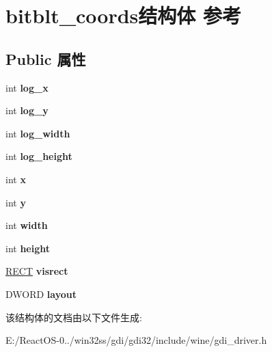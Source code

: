\hypertarget{structbitblt__coords}{}\section{bitblt\+\_\+coords结构体 参考}
\label{structbitblt__coords}
\subsection*{Public 属性}
\begin{DoxyCompactItemize}
\item 
\mbox{\label{structbitblt__coords_a80fb5dfafa963c3a7a1f506403ad9fc3}} 
int {\bfseries log\+\_\+x}
\item 
\mbox{\label{structbitblt__coords_a01d92140cc63198579fd06291dcff755}} 
int {\bfseries log\+\_\+y}
\item 
\mbox{\label{structbitblt__coords_a00125c247fc323b56db01a673d31b216}} 
int {\bfseries log\+\_\+width}
\item 
\mbox{\label{structbitblt__coords_a0658c4065a6dc64f9de3ae4c4e26aa55}} 
int {\bfseries log\+\_\+height}
\item 
\mbox{\label{structbitblt__coords_a5372872ac2b8e2645fd9c67e0291373f}} 
int {\bfseries x}
\item 
\mbox{\label{structbitblt__coords_a738c1b1f34c0a2221623c58daeb06961}} 
int {\bfseries y}
\item 
\mbox{\label{structbitblt__coords_ad80b4a1c8b5b30448371c91dba2be332}} 
int {\bfseries width}
\item 
\mbox{\label{structbitblt__coords_abd0bb4ae2471ae0fb62a935e040ecd3e}} 
int {\bfseries height}
\item 
\mbox{\label{structbitblt__coords_a6ffca3e62b070df035143cc268e27073}} 
\hyperlink{structtag_r_e_c_t}{R\+E\+CT} {\bfseries visrect}
\item 
\mbox{\label{structbitblt__coords_a1ef4b9912458d1c14594dd5a647ad758}} 
D\+W\+O\+RD {\bfseries layout}
\end{DoxyCompactItemize}


该结构体的文档由以下文件生成\+:\begin{DoxyCompactItemize}
\item 
E\+:/\+React\+O\+S-\/0../win32ss/gdi/gdi32/include/wine/gdi\+\_\+driver.\+h\end{DoxyCompactItemize}
